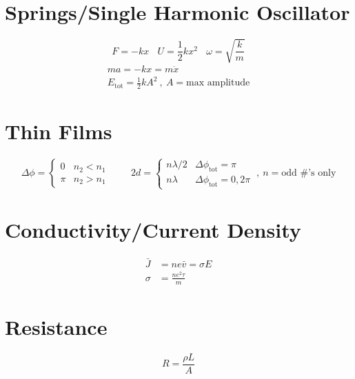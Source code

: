 \documentclass[10pt,a4paper]{article}
\begin{document}
\section{Springs/Single Harmonic Oscillator} %
\label{sec:springs_single_harmonic_oscillator}
\begin{equation}
    F = -kx~~~~ U = \frac{1}{2}kx^2 ~~~~ \omega = \sqrt{\frac{k}{m}}
\end{equation}
\begin{align}
    ma = -kx = m \ddot{x}\\
    E_{\textrm{tot}} = \frac{1}{2}kA^2~, ~A=\textrm{max amplitude}
\end{align}

\section{Thin Films} %
\label{sec:thin_films}
\[
 \Delta \phi =
  \begin{cases}
   0  & n_2<n_1 \\
   \pi &  n_2>n_1
  \end{cases}
  ~~~~~~~~~~
  2d =
  \begin{cases}
   n\lambda/2  & \Delta \phi_{\textrm{tot}} = \pi \\
   n\lambda &  \Delta \phi_{\textrm{tot}} = 0,2\pi
  \end{cases}~,~n=\textrm{odd \#'s only}
\]

\section{Conductivity/Current Density} %
\label{sec:conductivity_current_density}
\begin{align}
\bar{J} &= ne\bar{v} = \sigma E\\
\sigma &= \frac{ne^2\tau}{m}
\end{align}

\section{Resistance} %
\label{sec:resistance}
\begin{equation}
    R = \frac{\rho L}{A}
\end{equation}
\end{document}

